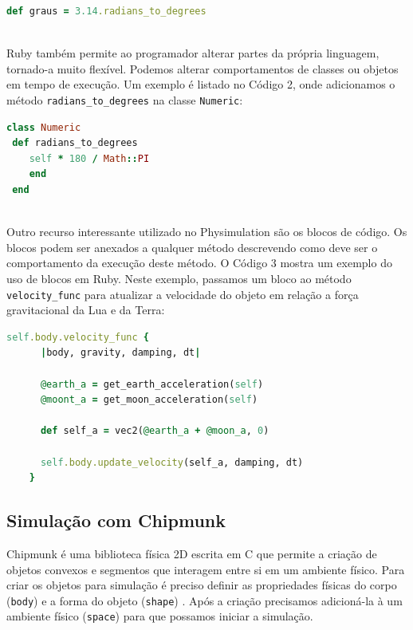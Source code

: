 \begin{lstlisting}[language=Ruby, caption=Conversão de radianos em graus]
  def graus = 3.14.radians_to_degrees
\end{lstlisting} 

\ \\ 
\hspace*{14pt} Ruby também permite ao programador alterar partes da própria linguagem, tornado-a muito flexível. Podemos alterar comportamentos de classes ou objetos 
em tempo de execução. Um exemplo é listado no Código 2, onde adicionamos o método {\tt radians\_to\_degrees} na classe {\tt Numeric}: 

\begin{lstlisting}[language=Ruby, caption=physics.rb ]
class Numeric
 def radians_to_degrees
    self * 180 / Math::PI
    end
 end
\end{lstlisting} 

\ \\
\hspace*{14pt} Outro recurso interessante utilizado no Physimulation são os blocos de código. Os blocos podem ser anexados a qualquer método descrevendo como deve ser 
o comportamento da execução deste método. O Código 3 mostra um exemplo do uso de blocos em Ruby. Neste exemplo, passamos um bloco ao método {\tt velocity\_func} para atualizar a velocidade do objeto em relação a força gravitacional da Lua e da Terra:

\begin{lstlisting}[language=Ruby, caption=RocketSimulation.rb]
    self.body.velocity_func { 
      |body, gravity, damping, dt|

      @earth_a = get_earth_acceleration(self)
      @moont_a = get_moon_acceleration(self)

      def self_a = vec2(@earth_a + @moon_a, 0)

      self.body.update_velocity(self_a, damping, dt)
    }
\end{lstlisting}

\subsection{Simulação com Chipmunk}
Chipmunk é uma biblioteca física 2D escrita em C que permite a criação de objetos convexos e segmentos que interagem entre si em um ambiente físico. Para criar os 
objetos para simulação é preciso definir as propriedades físicas do corpo ({\tt body}) e a forma do objeto ({\tt shape}) . Após a criação precisamos adicioná-la à um ambiente físico ({\tt space}) para que possamos
iniciar a simulação.\\

